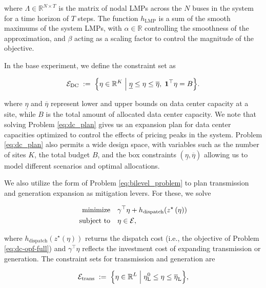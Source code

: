 where $\Lambda \in \mathbb{R}^{N \times T}$ is the matrix of nodal LMPs across the $N$ buses in the system for a time horizon of $T$ steps. The function $h_{\text{LMP}}$ is a sum of the smooth maximums of the system LMPs, with $\alpha \in \mathbb{R}$ controlling the smoothness of the approximation, and $\beta$ acting as a scaling factor to control the magnitude of the objective. 

In the base experiment, we define the constraint set as

\begin{equation}
\begin{aligned}
\mathcal{E}_{\text{DC}}
\;:=\;
\Bigl\{
\eta \in \mathbb{R}^{K}
\;\Big|\;
\underline{\eta} \le \eta \le \overline{\eta},\;
\mathbf{1}^\top \eta = B
\Bigr\}.
\end{aligned}
\end{equation}

where $\underline{\eta}$ and $\overline{\eta}$ represent lower and upper bounds on data center capacity at a site, while $B$ is the total amount of allocated data center capacity. We note that solving Problem \ref{eq:dc_plan} gives us an expansion plan for data center capacities optimized to control the effects of pricing peaks in the system. Problem \ref{eq:dc_plan} also permits a wide design space, with variables such as the number of sites $K$, the total budget $B$, and the box constraints $(\underline{\eta}, \overline{\eta})$ allowing us to model different scenarios and optimal allocations. 

We also utilize the form of Problem \ref{eq:bilevel_problem} to plan transmission and generation expansion as mitigation levers. For these, we solve

\begin{equation}
\begin{aligned}
\text{minimize}\quad & \gamma^{\top}\eta + h_{\text{dispatch}}(z^{\star}\left(\eta)\right) \\
\text{subject to}\quad & \eta \in \mathcal{E},
\label{eq:grid_expansion}
\end{aligned}
\end{equation}

where $h_{\text{dispatch}}(z^{\star}(\eta))$ returns the dispatch cost (i.e., the objective of Problem \ref{eq:dc-opf-full}) and $\gamma^{\top}\eta$ reflects the investment cost of expanding transmission or generation. The constraint sets for transmission and generation are

\begin{equation}
\begin{aligned}
\mathcal{E}_{\text{trans}}
\;:=\;
\Bigl\{
\eta \in \mathbb{R}^{L}
\;\Big|\;
\eta^{0}_{\text{L}} \le \eta \le \overline{\eta}_{\text{L}}
\Bigr\},
\end{aligned}
\end{equation}


